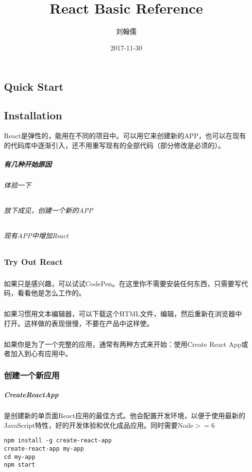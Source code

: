 \documentclass{book}
\begin{document}
\begin{CJK*}{UTF8}{gbsn}
\title{React Basic Reference}
\author{刘翰儒}
\date{2017-11-30}
\maketitle
\tableofcontents
\chapter{Quick Start}
\section{Installation} React是弹性的，能用在不同的项目中。可以用它来创建新的APP，也可以在现有的代码库中逐渐引入，还不用重写现有的全部代码（部分修改是必须的）。
\paragraph{有几种开始原因}
\subparagraph{体验一下}
\subparagraph{放下成见，创建一个新的APP}
\subparagraph{现有APP中增加React}
\subsection{Try Out React}
\paragraph{}如果只是感兴趣，可以试试CodePen。在这里你不需要安装任何东西，只需要写代码，看看他是怎么工作的。
\paragraph{}如果习惯用文本编辑器，可以下载这个HTML文件，编辑，然后重新在浏览器中打开。这样做的表现很慢，不要在产品中这样使。
\paragraph{}如果你是为了一个完整的应用，通常有两种方式来开始：使用Create React App或者加入到心有应用中。
\subsection{创建一个新应用}
\paragraph{CreateReactApp}是创建新的单页面React应用的最佳方式。他会配置开发环境，以便于使用最新的JavaScript特性，好的开发体验和优化成品应用。同时需要Node$ >=6 $
\begin{verbatim}
npm install -g create-react-app
create-react-app my-app
cd my-app
npm start
\end{verbatim}

\end{CJK*}
\end{document}
